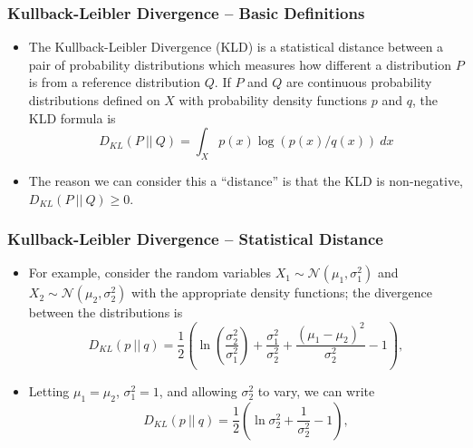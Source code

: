 \documentclass[11pt,aspectratio=169]{beamer}
\newcommand{\parens}[1]{\left(#1\right)}
\begin{document}
    \begin{frame}
        \frametitle{Kullback-Leibler Divergence -- Basic Definitions}
        \begin{itemize}
            \item 
            The Kullback-Leibler Divergence (KLD) is a statistical distance between a 
            pair of probability distributions which measures how different a distribution $P$ is 
            from a reference distribution $Q$. If $P$ and $Q$ are continuous probability
            distributions defined on $X$
            with probability density functions $p$ and $q$, the KLD formula 
            is
            \begin{equation}
                D_{KL}(P\ |\!|\ Q) = \int_X p(x)\log\parens{p(x)/q(x)}\ dx \label{eqn:continuous KLD}
            \end{equation}
            \item
            The reason we can consider this a ``distance'' is that the KLD 
            is non-negative, $D_{KL}(P\ |\!|\ Q) \geq 0$. 
        \end{itemize}
    \end{frame}

    \begin{frame}
        \frametitle{Kullback-Leibler Divergence -- Statistical Distance}
        \begin{itemize}
            \item 
            For example, consider the random variables $X_1 \sim 
            \mathcal{N}(\mu_1, \sigma_1^2)$ and $X_2 \sim \mathcal{N}(\mu_2, \sigma_2^2)$ 
            with the appropriate density functions; the divergence 
            between the distributions is
            \begin{equation}
                D_{KL}(p\ |\!|\ q) = \frac{1}{2}\parens{\ln\parens{\frac{\sigma_2^2}{\sigma_1^2}} + 
                \frac{\sigma_1^2}{\sigma_2^2} + \frac{(\mu_1 - \mu_2)^2}{\sigma_2^2} - 1}, \label{eqn:normal divergence}
            \end{equation}
            \item
            Letting $\mu_1 = \mu_2$, $\sigma_1^2 = 1$, and allowing $\sigma_2^2$ to vary, we can 
            write 
            \begin{equation}
                D_{KL}(p\ |\!|\ q) = \frac{1}{2}\parens{\ln\sigma_2^2 + 
                \frac{1}{\sigma_2^2} - 1}, \label{eqn:normal divergence2}
            \end{equation}
        \end{itemize}
    \end{frame}
\end{document}
